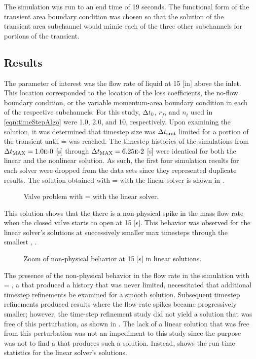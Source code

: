 The simulation was run to an end time of 19 seconds.
The functional form of the transient area boundary condition was chosen so that the solution of the transient area subchannel would mimic each of the three other subchannels for portions of the transient.

\subsection{Results}
\label{subsect:valveResults}

The parameter of interest was the flow  rate of liquid at 15 [in] above the inlet.
This location corresponded to the location of the loss coefficients, the no-flow boundary condition, or the variable momentum-area boundary condition in each of the respective subchannels.
For this study, $\dt{}_{0}$, $r_{f}$, and $n_{t}$ used in \eqref{eqn:timeStepAlgo} were 1.0, 2.0, and 10, respectively.
Upon examining the solution, it was determined that timestep size was $\dtcrnt{}$ limited for a portion of the transient until \dtmax{} =  was reached.
The timestep histories of the simulations from $\dtmax{} = \expneg{1.0}{0}$ [s] through $\dtmax{} = \expneg{6.25}{2}$ [s] were identical for both the linear and the nonlinear solution.
As such, the first four simulation results for each solver were dropped from the data sets since they represented duplicate results.
The solution obtained with \dtmax{} =  with the linear solver is shown in .

\begin{figure}[h!tb]
\centering

\caption{Valve problem with \dtmax{} =  with the linear solver.}
\label{fig:valveLin6pt25em02}
\end{figure}

This solution shows that the there is a non-physical spike in the mass flow rate when the closed valve starts to open at 15 [s].
This behavior was observed for the linear solver's solutions at successively smaller max timesteps through the smallest \dtmax{}, .

\begin{figure}[h!tb]
\centering

\caption{Zoom of non-physical behavior at 15 [s] in linear solutions.}
\label{fig:valveLinSols}
\end{figure}

The presence of the non-physical behavior in the flow rate in the simulation with \dtmax{} = , a \dtmax{} that produced a \dt{} history that was never \dtcrnt{} limited, necessitated that additional timestep refinements be examined for a smooth solution.
Subsequent timestep refinements produced results where the flow-rate spikes became progressively smaller; however, the time-step refinement study did not yield a solution that was free of this perturbation, as shown in .
The lack of a linear solution that was free from this perturbation was not an impediment to this study since the purpose was not to find a \dtmax{} that produces such a solution.
Instead,  shows the run time statistics for the linear solver's solutions.

